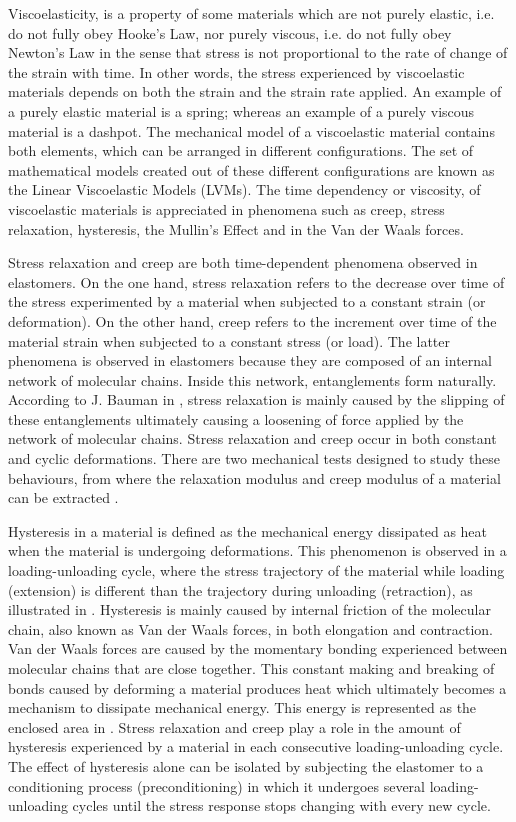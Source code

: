 Viscoelasticity, is a property of some materials which are not purely elastic, i.e. do not fully obey Hooke's Law, nor purely viscous, i.e. do not fully obey Newton's Law in the sense that stress is not proportional to the rate of change of the strain with time. In other words, the stress experienced by viscoelastic materials depends on both the strain and the strain rate applied. An example of a purely elastic material is a spring; whereas an example of a purely viscous material is a dashpot. The mechanical model of a viscoelastic material contains both elements, which can be arranged in different configurations. The set of mathematical models created out of these different configurations are known as the Linear Viscoelastic Models (LVMs). The time dependency or viscosity, of viscoelastic materials is appreciated in phenomena such as creep, stress relaxation, hysteresis, the Mullin's Effect and in the Van der Waals forces.

Stress relaxation and creep are both time-dependent phenomena observed in elastomers. On the one hand, stress relaxation refers to the decrease over time of the stress experimented by a material when subjected to a constant strain (or deformation). On the other hand, creep refers to the increment over time of the material strain when subjected to a constant stress (or load). The latter phenomena is observed in elastomers because they are composed of an internal network of molecular chains. Inside this network, entanglements form naturally. According to J. Bauman in \cite{Bauman2008}, stress relaxation is mainly caused by the slipping of these entanglements ultimately causing a loosening of force applied by the network of molecular chains. Stress relaxation and creep occur in both constant and cyclic deformations. There are two mechanical tests designed to study these behaviours, from where the relaxation modulus and creep modulus of a material can be extracted \cite{oberg2016}. 

Hysteresis in a material is defined as the mechanical energy dissipated as heat when the material is undergoing deformations. This phenomenon is observed in a loading-unloading cycle, where the stress trajectory of the material while loading (extension) is different than the trajectory during unloading (retraction), as illustrated in . Hysteresis is mainly caused by internal friction of the molecular chain, also known as Van der Waals forces, in both elongation and contraction. Van der Waals forces are caused by the momentary bonding experienced between molecular chains that are close together. This constant making and breaking of bonds caused by deforming a material produces heat which ultimately becomes a mechanism to dissipate mechanical energy. This energy is represented as the enclosed area in . Stress relaxation and creep play a role in the amount of hysteresis experienced by a material in each consecutive loading-unloading cycle. The effect of hysteresis alone can be isolated by subjecting the elastomer to a conditioning process (preconditioning) in which it undergoes several loading-unloading cycles until the stress response stops changing with every new cycle.

